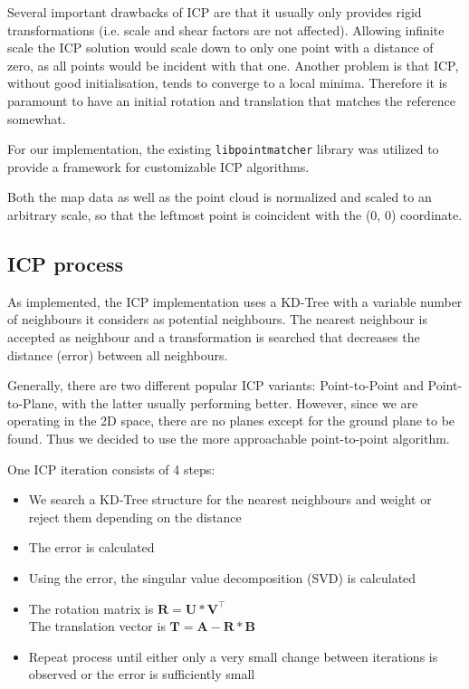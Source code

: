 \documentclass[10pt,twocolumn,letterpaper]{article}
\newcommand{\matr}[1]{\mathbf{#1}} %
\begin{document}
Several important drawbacks of ICP are that it usually only provides rigid transformations (i.e. scale and shear factors are not affected). Allowing infinite scale the ICP solution would scale down to only one point with a distance of zero, as all points would be incident with that one. Another problem is that ICP, without good initialisation, tends to converge to a local minima. Therefore it is paramount to have an initial rotation and translation that matches the reference somewhat. %

For our implementation, the existing \texttt{libpointmatcher}\cite{Pomerleau12comp} library was utilized to provide a framework for customizable ICP algorithms.

Both the map data as well as the point cloud is normalized and scaled to an arbitrary scale, so that the leftmost point is coincident with the (0, 0) coordinate.

\subsection{ICP process}

As implemented, the ICP implementation uses a KD-Tree with a variable number of neighbours it considers as potential neighbours. The nearest neighbour is accepted as neighbour and a transformation is searched that decreases the distance (error) between all neighbours. 

Generally, there are two different popular ICP variants: Point-to-Point and Point-to-Plane, with the latter usually performing better. However, since we are operating in the 2D space, there are no planes except for the ground plane to be found. Thus we decided to use the more approachable point-to-point algorithm.

One ICP iteration consists of 4 steps:

\begin{itemize}
   \item We search a KD-Tree structure for the nearest neighbours and weight or reject them depending on the distance
   \item The error is calculated
   \item Using the error, the singular value decomposition (SVD) is calculated
   \item The rotation matrix is $\matr{R} =\matr{U} * \matr{V}^{\intercal}$
      \\ The translation vector is $\matr{T} = \matr{A} - \matr{R} * \matr{B}$
      \item Repeat process until either only a very small change between iterations is observed or the error is sufficiently small
\end{itemize}
\end{document}

